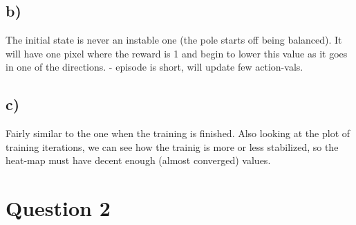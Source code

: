 \documentclass{article}
\begin{document}
\subsection{b)}
The initial state is never an instable one (the pole starts off being balanced). It will have one pixel where the reward is 1 and begin to lower this value as it goes in one of the directions. - episode is short, will update few action-vals.
\subsection{c)}
Fairly similar to the one when the training is finished. Also looking at the plot of training iterations, we can see how the trainig is more or less stabilized, so the heat-map must have decent enough (almost converged) values.
\section{Question 2}
\end{document}
